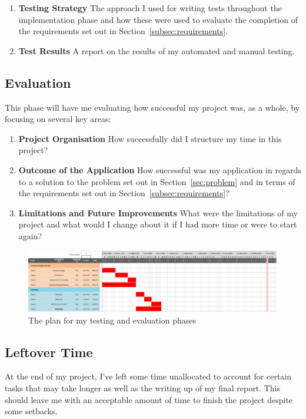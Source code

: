 \begin{enumerate}
  \item \textbf{Testing Strategy} The approach I used for writing tests throughout the implementation phase and how these were used to evaluate the completion of the requirements set out in Section~\ref{subsec:requirements}. 
  \item \textbf{Test Results} A report on the results of my automated and manual testing.
\end{enumerate}

\subsection*{Evaluation}
This phase will have me evaluating how successful my project was, as a whole, by focusing on several key areas:

\begin{enumerate}
  \item \textbf{Project Organisation} How successfully did I structure my time in this project?
  \item \textbf{Outcome of the Application} How successful was my application in regards to a solution to the problem set out in Section~\ref{sec:problem} and in terms of the requirements set out in Section~\ref{subsec:requirements}?
  \item \textbf{Limitations and Future Improvements} What were the limitations of my project and what would I change about it if I had more time or were to start again?
\end{enumerate}

\begin{figure}[ht]
  \centering
  \includegraphics[width=\textwidth]{assets/images/charts/gantt/testing-evaluation.png}
  \caption{The plan for my testing and evaluation phases}
  \label{fig:final-gantt}
\end{figure}

\subsection*{Leftover Time}

At the end of my project, I've left some time unallocated to account for certain tasks that may take longer as well as the writing up of my final report. This should leave me with an acceptable amount of time to finish the project despite some setbacks.
